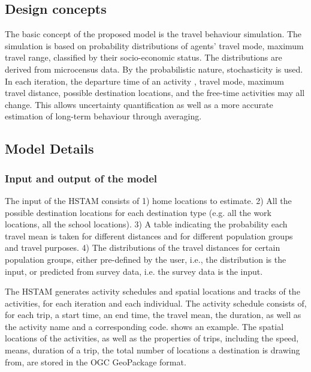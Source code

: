 \documentclass[]{article}
\begin{document}
\subsection{Design concepts}
The basic concept of the proposed model is the travel behaviour simulation. The simulation is based on probability distributions of agents' travel mode, maximum travel range, classified by their socio-economic status. The distributions are derived from microcensus data. By the probabilistic nature, stochasticity is used. In each iteration, the departure time of an activity , travel mode, maximum travel distance, possible destination locations, and the free-time activities may all change. This allows uncertainty quantification as well as a more accurate estimation of long-term behaviour through averaging. 


\subsection{Model Details}
\subsubsection{Input and output of the model}

The input of the HSTAM consists of 1) home locations to estimate. 2) All the possible destination locations for each destination type (e.g. all the work locations, all the school locations). 3) A table indicating the probability each travel mean is taken for different distances and for different population groups and travel purposes. 4) The distributions of the travel distances for certain population groups, either pre-defined by the user, i.e., the distribution is the input, or predicted from survey data, i.e. the survey data is the input.
 

The HSTAM generates activity schedules and spatial locations and tracks of the activities, for each iteration and each individual. The activity schedule consists of, for each trip, a start time, an end time, the travel mean, the duration, as well as the activity name and a corresponding code.  shows an example. The spatial locations of the activities, as well as the properties of trips, including the speed, means, duration of a trip, the total number of locations a destination is drawing from, are stored in the OGC GeoPackage format. 
\end{document}
